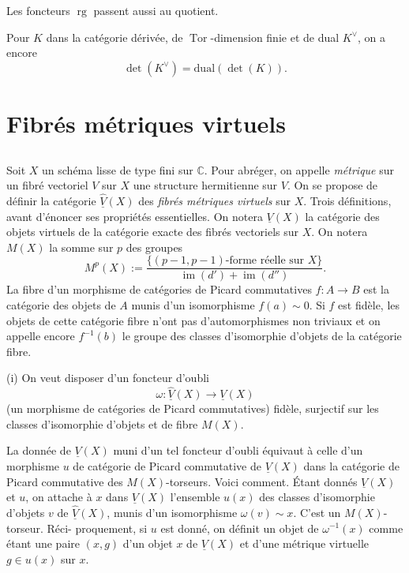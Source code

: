 \documentclass[12pt,a4paper]{article}
\theoremstyle{plain}
\theoremstyle{definition}
\DeclareMathOperator{\rank}{rg}
\DeclareMathOperator{\Tor}{Tor}
\DeclareMathOperator{\im}{im}
\newcommand{\CC}{\mathbb{C}}
\begin{document}
Les foncteurs $\rank$ passent aussi au quotient.

Pour $K$ dans la cat\'egorie d\'eriv\'ee, de $\Tor$-dimension finie et de dual $K^\vee$,
on a encore
\[
\det(K^\vee) = \text{dual}(\det(K)) .
\]



\section{Fibr\'es m\'etriques virtuels}

\subsection{}

Soit $X$ un sch\'ema lisse de type fini sur $\CC$. Pour abr\'eger, on appelle
\emph{m\'etrique} sur un fibr\'e vectoriel $V$ sur $X$ une structure hermitienne sur $V$.
On se propose de d\'efinir la cat\'egorie $\widehat{\underline{V}}(X)$ des \emph{fibr\'es m\'etriques virtuels} sur
$X$. Trois d\'efinitions, avant d'\'enoncer ses propri\'et\'es essentielles. On notera
$\underline{V}(X)$ la cat\'egorie des objets virtuels de la cat\'egorie exacte des fibr\'es vectoriels
sur $X$. On notera $M(X)$ la somme sur $p$ des groupes
\[
M^p(X) := \frac{\{\text{$(p-1,p-1)$-forme r\'eelle sur $X$}\}}{\im(d') + \im(d'')} .
\]
La fibre d'un morphisme de cat\'egories de Picard commutatives $f: A \to B$ est la
cat\'egorie des objets de $A$ munis d'un isomorphisme $f(a) \sim 0$. Si $f$ est fid\`ele,
les objets de cette cat\'egorie fibre n'ont pas d'automorphismes non triviaux et
on appelle encore $f^{-1}(b)$ le groupe des classes d'isomorphie d'objets de la cat\'egorie
fibre.

\medskip

(i) On veut disposer d'un foncteur d'oubli
\[
\omega: \widehat{\underline{V}}(X) \to \underline{V}(X)
\]
(un morphisme de cat\'egories de Picard commutatives) fid\`ele, surjectif sur les
classes d'isomorphie d'objets et de fibre $M(X)$.

La donn\'ee de $\underline{V}(X)$ muni d'un tel foncteur d'oubli \'equivaut \`a celle d'un
morphisme $u$ de cat\'egorie de Picard commutative de $\underline{V}(X)$ dans la cat\'egorie de
Picard commutative des $M(X)$-torseurs. Voici comment. \'Etant donn\'es $\underline{V}(X)$ et
$u$, on attache \`a $x$ dans $\underline{V}(X)$ l'ensemble $u(x)$ des classes d'isomorphie d'objets
$v$ de $\widehat{\underline{V}}(X)$, munis d'un isomorphisme $\omega(v) \sim x$. C'est un $M(X)$-torseur. R\'eci-
proquement, si $u$ est donn\'e, on d\'efinit un objet de $\omega^{-1}(x)$ comme \'etant une paire
$(x, g)$ d'un objet $x$ de $\underline{V}(X)$ et d'une m\'etrique virtuelle $g \in u(x)$ sur $x$.
\end{document}
